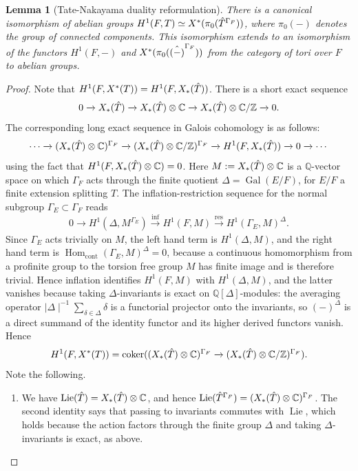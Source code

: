 \documentclass[11pt,a4paper]{article}
\theoremstyle{definition}
\theoremstyle{plain}
\newtheorem{Le}[shared]{Lemma}
\theoremstyle{remark}
\theoremstyle{plain}
\DeclareMathOperator{\Hom}{Hom}
\DeclareMathOperator{\Lie}{Lie}
\DeclareMathOperator{\coker}{coker}
\DeclareMathOperator{\Gal}{Gal}
\begin{document}
\begin{Le}[Tate-Nakayama duality reformulation]\label{Tatenakayamatori}
    There is a canonical isomorphism of abelian groups $H^1(F,T) \simeq X^*(\pi_0(\Hat{T}^{\Gamma_F}))$, where $\pi_0(-)$ denotes the group of connected components. This isomorphism extends to an isomorphism of the functors $H^1(F,-)$ and $X^*(\pi_0(\Hat{(-)}^{\Gamma_F}))$ from the category of tori over $F$ to abelian groups.
\end{Le}
\begin{proof}
    Note that $H^1(F,X^*(T)) = H^1(F,X_*(\Hat{T}))$. There is a short exact sequence
$$ 0 \xrightarrow[]{} X_*(\Hat{T}) \xrightarrow[]{} X_*(\Hat{T}) \otimes \mathbb{C} \xrightarrow{} X_*(\Hat{T}) \otimes \mathbb{C}/\mathbb{Z} \xrightarrow[]{} 0.$$
The corresponding long exact sequence in Galois cohomology is as follows:
$$ \cdots \xrightarrow[]{} (X_*(\Hat{T}) \otimes \mathbb{C})^{\Gamma_F} \xrightarrow[]{} (X_*(\Hat{T}) \otimes \mathbb{C}/\mathbb{Z})^{\Gamma_F} \xrightarrow[]{} H^1(F, X_*(\Hat{T})) \xrightarrow[]{} 0 \xrightarrow[]{} \cdots$$
using the fact that $H^1(F, X_*(\Hat{T}) \otimes \mathbb{C}) = 0$. Here $M := X_*(\Hat{T}) \otimes \mathbb{C}$ is a $\mathbb{Q}$-vector space on which $\Gamma_F$ acts through the finite quotient $\Delta = \Gal(E/F)$, for $E/F$ a finite extension splitting $T$. The inflation-restriction sequence for the normal subgroup $\Gamma_E \subset \Gamma_F$ reads
$$0 \xrightarrow[]{} H^1(\Delta, M^{\Gamma_E}) \xrightarrow[]{\mathrm{inf}} H^1(F, M) \xrightarrow[]{\mathrm{res}} H^1(\Gamma_E, M)^{\Delta}.$$
Since $\Gamma_E$ acts trivially on $M$, the left hand term is $H^1(\Delta, M)$, and the right hand term is $\Hom_{\text{cont}}(\Gamma_E, M)^{\Delta} = 0$, because a continuous homomorphism from a profinite group to the torsion free group $M$ has finite image and is therefore trivial. Hence inflation identifies $H^1(F, M)$ with $H^1(\Delta, M)$, and the latter vanishes because taking $\Delta$-invariants is exact on $\mathbb{Q}[\Delta]$-modules: the averaging operator $\mid \Delta \mid^{-1} \sum_{\delta \in \Delta} \delta$ is a functorial projector onto the invariants, so $(-)^{\Delta}$ is a direct summand of the identity functor and its higher derived functors vanish. Hence
$$H^1(F, X^*(T)) = \coker ((X_*(\Hat{T}) \otimes \mathbb{C})^{\Gamma_F} \xrightarrow[]{} (X_*(\Hat{T}) \otimes \mathbb{C}/\mathbb{Z})^{\Gamma_F}).$$
Note the following.
\begin{enumerate}
    \item We have $\Lie(\Hat{T}) = X_*(\Hat{T}) \otimes \mathbb{C}$, and hence $\Lie(\Hat{T}^{\Gamma_F}) = (X_*(\Hat{T}) \otimes \mathbb{C})^{\Gamma_F}$. The second identity says that passing to invariants commutes with $\Lie$, which holds because the action factors through the finite group $\Delta$ and taking $\Delta$-invariants is exact, as above.

\end{enumerate}
\end{proof}
\end{document}
